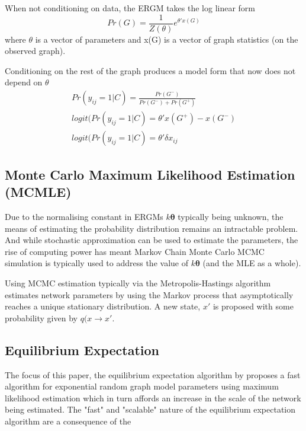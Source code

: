 When not conditioning on data, the ERGM takes the log linear form
\begin{equation}
\label{eqn:ergm_general_form}
    Pr(G) = {\frac{1}{Z(\theta)}}e^{\theta'x(G)}
\end{equation}
where $\theta$ is a vector of parameters and x(G) is a vector of graph statistics (on the observed graph).

Conditioning on the rest of the graph produces a model form that now does not depend on $\theta$
\begin{equation}
\begin{aligned}
    Pr(y_{ij} = 1|C) = \frac{Pr(G^-)}{Pr(G^-) + Pr(G^+)} \\
    logit(Pr(y_{ij} = 1|C) = \theta'{x(G^+) - x(G^-)} \\
    \label{eqn:ergm_no_theta}
    logit(Pr(y_{ij} = 1|C) = \theta'\delta x_{ij}
\end{aligned}
\end{equation}
\subsection{Monte Carlo Maximum Likelihood Estimation (MCMLE)}

Due to the normalising constant in ERGMs $k\boldsymbol{\theta}$ typically being unknown, the means of estimating the probability distribution remains an intractable problem. And while stochastic approximation can be used to estimate the parameters, the rise of computing power has meant Markov Chain Monte Carlo MCMC simulation is typically used to address the value of $k\boldsymbol{\theta}$ (and the MLE as a whole).

Using MCMC estimation typically via the Metropolis-Hastings algorithm estimates network parameters by using the Markov process that asymptotically reaches a unique stationary distribution. A new state, $x'$ is proposed with some probability given by $q(x \rightarrow x'$. 

\subsection{Equilibrium Expectation}

The focus of this paper, the equilibrium expectation algorithm by \citet{eqexpectation} proposes a fast algorithm for exponential random graph model parameters using maximum likelihood estimation which in turn affords an increase in the scale of the network being estimated. The "fast" and "scalable" nature of the equilibrium expectation algorithm are a consequence of the 

